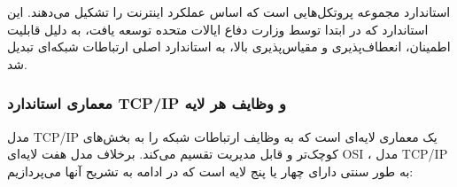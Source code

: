 
استاندارد  مجموعه پروتکل‌هایی است که اساس عملکرد اینترنت را تشکیل می‌دهند. این استاندارد که در ابتدا توسط وزارت دفاع ایالات متحده توسعه یافت، به دلیل قابلیت اطمینان، انعطاف‌پذیری و مقیاس‌پذیری بالا، به استاندارد اصلی ارتباطات شبکه‌ای تبدیل شد.

\subsubsection*{معماری استاندارد TCP/IP و وظایف هر لایه}

مدل TCP/IP یک معماری لایه‌ای است که به وظایف ارتباطات شبکه را به بخش‌های کوچک‌تر و قابل مدیریت تقسیم می‌کند. برخلاف مدل هفت لایه‌ای OSI ، مدل TCP/IP به طور سنتی دارای چهار یا پنج لایه است که در ادامه به تشریح آنها می‌پردازیم:


